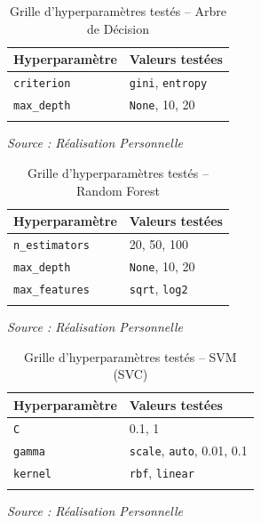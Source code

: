 \documentclass[a4paper,12pt, oneside]{article}
\begin{document}
\begin{longtable}{|p{3.5cm}|p{9.5cm}|}
\hline
\textbf{Hyperparamètre} & \textbf{Valeurs testées} \\
\hline
\texttt{criterion} & \texttt{gini}, \texttt{entropy} \\
\hline
\texttt{max\_depth} & \texttt{None}, 10, 20 \\
\hline
\caption{Grille d'hyperparamètres testés -- Arbre de Décision} \\
\end{longtable}
\begin{center}
\vspace{-0.85cm}
\textit{Source : Réalisation Personnelle}
\end{center}

\begin{longtable}{|p{3.5cm}|p{9.5cm}|}
\hline
\textbf{Hyperparamètre} & \textbf{Valeurs testées} \\
\hline

\texttt{n\_estimators} & 20, 50, 100 \\
\hline
\texttt{max\_depth} & \texttt{None}, 10, 20 \\
\hline
\texttt{max\_features} & \texttt{sqrt}, \texttt{log2} \\
\hline
\caption{Grille d'hyperparamètres testés -- Random Forest} \\
\end{longtable}
\begin{center}
\vspace{-0.85cm}
\textit{Source : Réalisation Personnelle}
\end{center}

\begin{longtable}{|p{3.5cm}|p{9.5cm}|}
\hline
\textbf{Hyperparamètre} & \textbf{Valeurs testées} \\
\hline

\texttt{C} & 0.1, 1 \\
\hline
\texttt{gamma} & \texttt{scale}, \texttt{auto}, 0.01, 0.1 \\
\hline
\texttt{kernel} & \texttt{rbf}, \texttt{linear} \\
\hline
\caption{Grille d'hyperparamètres testés -- SVM (SVC)} \\
\end{longtable}
\begin{center}
\vspace{-0.85cm}
\textit{Source : Réalisation Personnelle}
\end{center}
\end{document}
